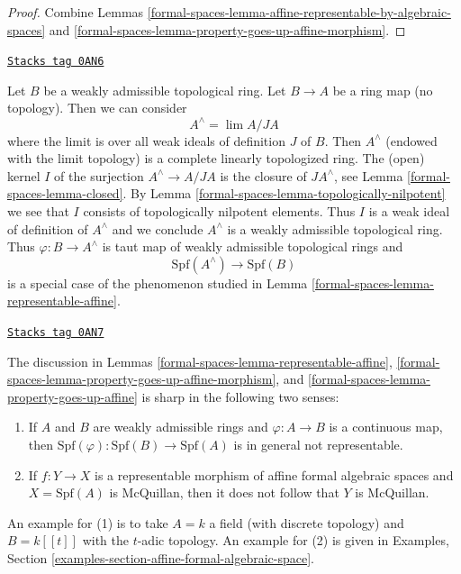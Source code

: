 \begin{proof}
Combine Lemmas \ref{formal-spaces-lemma-affine-representable-by-algebraic-spaces} and
\ref{formal-spaces-lemma-property-goes-up-affine-morphism}.
\end{proof}

\begin{example}
\label{formal-spaces-example-representable-morphism-from-completion}
\href{https://stacks.math.columbia.edu/tag/0AN6}{\texttt{Stacks tag 0AN6}}

Let $B$ be a weakly admissible topological ring. Let $B \to A$ be
a ring map (no topology). Then we can consider
$$
A^\wedge = \lim A/JA
$$
where the limit is over all weak ideals of definition $J$ of $B$.
Then $A^\wedge$ (endowed with the limit topology) is a
complete linearly topologized ring. The (open) kernel $I$
of the surjection $A^\wedge \to A/JA$ is the closure of $JA^\wedge$, see
Lemma \ref{formal-spaces-lemma-closed}. By
Lemma \ref{formal-spaces-lemma-topologically-nilpotent}
we see that $I$ consists of topologically nilpotent elements.
Thus $I$ is a weak ideal of definition of $A^\wedge$ and we conclude
$A^\wedge$ is a weakly admissible topological ring. Thus
$\varphi : B \to A^\wedge$ is taut map of weakly admissible
topological rings and
$$
\text{Spf}(A^\wedge) \longrightarrow \text{Spf}(B)
$$
is a special case of the phenomenon studied in
Lemma \ref{formal-spaces-lemma-representable-affine}.
\end{example}

\begin{remark}[Warning]

\label{formal-spaces-remark-warning}
\href{https://stacks.math.columbia.edu/tag/0AN7}{\texttt{Stacks tag 0AN7}}

The discussion in Lemmas \ref{formal-spaces-lemma-representable-affine},
\ref{formal-spaces-lemma-property-goes-up-affine-morphism}, and
\ref{formal-spaces-lemma-property-goes-up-affine}
is sharp in the following two senses:
\begin{enumerate}
\item If $A$ and $B$ are weakly admissible rings and $\varphi : A \to B$
is a continuous map, then
$\text{Spf}(\varphi) : \text{Spf}(B) \to \text{Spf}(A)$ is in general
not representable.
\item If $f : Y \to X$ is a representable morphism of affine
formal algebraic spaces and $X = \text{Spf}(A)$ is McQuillan,
then it does not follow that $Y$ is McQuillan.
\end{enumerate}
An example for (1) is to take $A = k$ a field (with discrete topology)
and $B = k[[t]]$ with the $t$-adic topology.
An example for (2) is given in
Examples, Section \ref{examples-section-affine-formal-algebraic-space}.
\end{remark}

